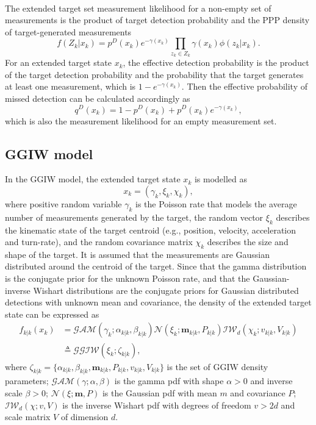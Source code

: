 ~\\
The extended target set measurement likelihood for a non-empty set of measurements is the product of target detection probability and the PPP density of target-generated measurements \cite{pmbmextended2}
\begin{equation}
    f(Z_k|x_k) = p^D(x_k)e^{-\gamma(x_k)}\prod_{z_k\in Z_k}\gamma(x_k)\phi(z_k|x_k).
\end{equation}
For an extended target state $x_k$, the effective detection probability is the product of the target detection probability and the probability that the target generates at least one measurement, which is $1-e^{-\gamma(x_k)}$. Then the effective probability of missed detection can be calculated accordingly as
\begin{equation}
    q^D(x_k) = 1 - p^D(x_k) + p^D(x_k)e^{-\gamma(x_k)},
\end{equation}
which is also the measurement likelihood for an empty measurement set.

\subsection{GGIW model}
In the GGIW model, the extended target state $x_k$ is modelled as 
\begin{equation}
    x_k=(\gamma_k,\xi_k,\chi_k),
\end{equation}
where positive random variable $\gamma_k$ is the Poisson rate that models the average number of measurements generated by the target, the random vector $\xi_k$ describes the kinematic state of the target centroid (e.g., position, velocity, acceleration and turn-rate), and the random covariance matrix $\chi_k$ describes the size and shape of the target. It is assumed that the measurements are Gaussian distributed around the centroid of the target. Since that the gamma distribution is the conjugate prior for the unknown Poisson rate, and that the Gaussian-inverse Wishart distributions are the conjugate priors for Gaussian distributed detections with unknown mean and covariance, the density of the extended target state can be expressed as
\begin{align}
f_{k|k}(x_k) &= \mathcal{GAM}(\gamma_k;\alpha_{k|k},\beta_{k|k})\mathcal{N}(\xi_k;\mathbf{m}_{k|k},P_{k|k})\mathcal{IW}_d(\chi_k;v_{k|k},V_{k|k}) \\
&\triangleq \mathcal{GGIW}(\xi_k;\zeta_{k|k}),
\end{align}
where $\zeta_{k|k} = \{\alpha_{k|k},\beta_{k|k},\mathbf{m}_{k|k},P_{k|k},v_{k|k},V_{k|k}\}$ is the set of GGIW density parameters; $\mathcal{GAM}(\gamma;\alpha,\beta)$ is the gamma pdf with shape $\alpha>0$ and inverse scale $\beta>0$; $\mathcal{N}(\xi;\mathbf{m},P)$ is the Gaussian pdf with mean $m$ and covariance $P$; $\mathcal{IW}_d(\chi;v,V)$ is the inverse Wishart pdf with degrees of freedom $v>2d$ and scale matrix $V$ of dimension $d$.




